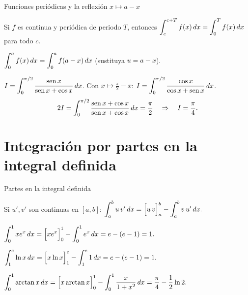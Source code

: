 \documentclass[10pt,aspectratio=169]{beamer}
\begin{document}
\begin{frame}{Funciones periódicas y la reflexión $x\mapsto a-x$}
  \begin{proposicion}[periodicidad]
    Si $f$ es continua y periódica de periodo $T$, entonces $\displaystyle\int_c^{c+T}f(x)\,dx=\int_0^Tf(x)\,dx$ para todo $c$.
  \end{proposicion}
  \begin{proposicion}[reflexión]
    $\displaystyle\int_0^af(x)\,dx=\int_0^af(a-x)\,dx$ \quad (sustituya $u=a-x$).
  \end{proposicion}
  \begin{ejemplo}
    $\displaystyle I=\int_0^{\pi/2}\frac{\operatorname{sen} x}{\operatorname{sen} x+\cos x}\,dx$. Con $x\mapsto\frac\pi2-x$:
    $\displaystyle I=\int_0^{\pi/2}\frac{\cos x}{\cos x+\operatorname{sen} x}\,dx$.
    \[ 2I=\int_0^{\pi/2}\frac{\operatorname{sen} x+\cos x}{\operatorname{sen} x+\cos x}\,dx=\frac\pi2\quad\Rightarrow\quad I=\frac\pi4. \]
  \end{ejemplo}
\end{frame}

\section{Integración por partes en la integral definida}

\begin{frame}{Partes en la integral definida}
  \begin{teorema}
    Si $u',v'$ son continuas en $[a,b]$:\qquad
    $\displaystyle\int_a^bu\,v'\,dx=\Big[u\,v\Big]_a^b-\int_a^bv\,u'\,dx.$
  \end{teorema}
  \begin{ejemplo}[1]
    $\displaystyle\int_0^1xe^x\,dx=\Big[xe^x\Big]_0^1-\int_0^1e^x\,dx=e-(e-1)=1.$
  \end{ejemplo}
  \begin{ejemplo}[2]
    $\displaystyle\int_1^e\ln x\,dx=\Big[x\ln x\Big]_1^e-\int_1^e1\,dx=e-(e-1)=1.$
  \end{ejemplo}
  \begin{ejemplo}[3]
    $\displaystyle\int_0^{1}\arctan x\,dx=\Big[x\arctan x\Big]_0^1-\int_0^1\frac{x}{1+x^2}\,dx=\frac\pi4-\frac12\ln2.$
  \end{ejemplo}
\end{frame}
\end{document}
